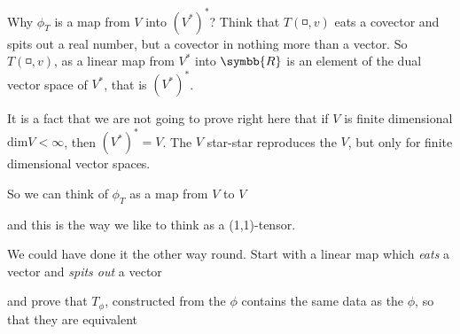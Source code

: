 Why $\phi_T$ is a map from $V$ into $(V^\ast)^\ast$?
Think that $T(\mdsmwhtsquare,v)$ eats a covector and spits out a real number, but a covector
in nothing more than a vector. So $T(\mdsmwhtsquare,v)$, as a linear map from $V^\ast$ into
$\symbb{R}$ is an element of the dual vector space of $V^\ast$, that is $(V^\ast)^\ast$.

It is a fact that we are not going to prove right here that if $V$ is finite dimensional
$\text{dim} V < \infty$, then $(V^\ast)^\ast = V$. The $V$ star-star reproduces the $V$, but only
for finite dimensional vector spaces.

So we can think of $\phi_T$ as a map from $V$ to $V$
\begin{center}
\end{center}
and this is the way we like to think as a (1,1)-tensor.

We could have done it the other way round. Start with a linear map which \emph{eats} a vector and
\emph{spits out} a vector
\begin{center}
\end{center}
and prove that $T_\phi$, constructed from the $\phi$ contains the same data as the $\phi$,
so that they are equivalent
\begin{center}
\end{center}

